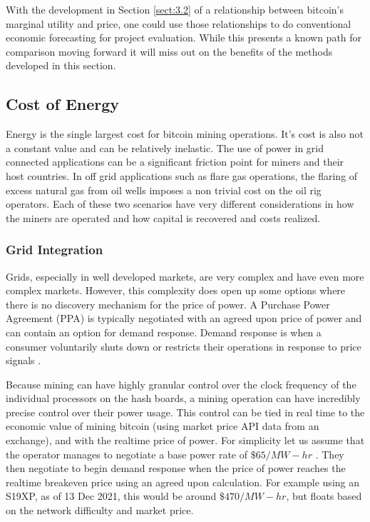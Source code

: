 \documentclass[runningheads]{llncs}
\begin{document}
With the development in Section \ref{sect:3.2} of a relationship between bitcoin's marginal utility and price, one could use those relationships to do conventional economic forecasting for project evaluation.
While this presents a known path for comparison moving forward it will miss out on the benefits of the methods developed in this section. 

\subsection{Cost of Energy}
Energy is the single largest cost for bitcoin mining operations.
It's cost is also not a constant value and can be relatively inelastic.
The use of power in grid connected applications can be a significant friction point for miners and their host countries.
In off grid applications such as flare gas operations, the flaring of excess natural gas from oil wells imposes a non trivial cost on the oil rig operators.
Each of these two scenarios have very different considerations in how the miners are operated and how capital is recovered and costs realized.

\subsubsection{Grid Integration}
Grids, especially in well developed markets, are very complex and have even more complex markets.
However, this complexity does open up some options where there is no discovery mechanism for the price of power.
A Purchase Power Agreement (PPA) is typically negotiated with an agreed upon price of power and can contain an option for demand response.
Demand response is when a consumer voluntarily shuts down or restricts their operations in response to price signals \cite{iea2021demand}.

Because mining can have highly granular control over the clock frequency of the individual processors on the hash boards, a mining operation can have incredibly precise control over their power usage.
This control can be tied in real time to the economic value of mining bitcoin (using market price API data from an exchange), and with the realtime price of power.
For simplicity let us assume that the operator manages to negotiate a base power rate of $\$65/MW-hr$ \cite{eia2021elect}.
They then negotiate to begin demand response when the price of power reaches the realtime breakeven price using an agreed upon calculation.
For example using an S19XP, as of 13 Dec 2021, this would be around $\$470/MW-hr$, but floats based on the network difficulty and market price.
\end{document}
